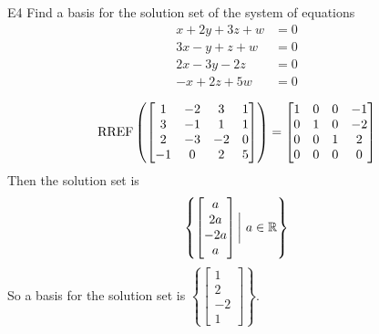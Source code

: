 \documentclass{sbgLAexam}
\begin{document}
\begin{problem}{E4}
Find a basis for the solution set of the system of equations
\begin{align*}
x+2y+3z+w &= 0 \\
3x-y+z+w &= 0 \\
2x-3y-2z &= 0 \\
-x+2z+5w &=0
\end{align*}
\end{problem}
\begin{solution}
$$\operatorname{RREF} \left(\begin{bmatrix} 1 & -2 & 3 & 1 \\ 3 & -1 & 1 & 1 \\ 2 & -3 & -2 & 0 \\ -1 & 0 & 2 & 5 \end{bmatrix} \right) = \begin{bmatrix} 1 & 0 & 0 & -1 \\ 0 & 1 & 0 & -2 \\ 0 & 0 & 1 & 2 \\ 0 & 0 & 0 & 0\end{bmatrix}$$
Then the solution set is
$$\left\{ \begin{bmatrix} a \\ 2a \\ -2a \\ a \end{bmatrix} \bigg |\ a \in \mathbb{R} \right\}$$
So a basis for the solution set is $\left\{\begin{bmatrix} 1 \\ 2 \\ -2 \\ 1\end{bmatrix} \right\}$.
\end{solution}
\end{document}
